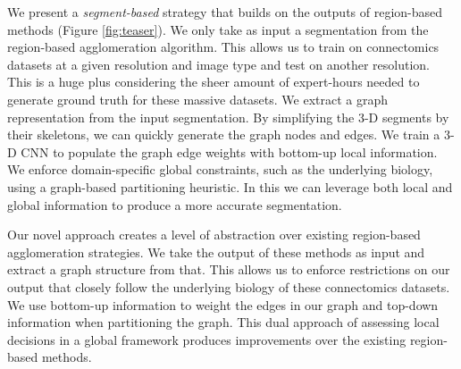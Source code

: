 We present a \textit{segment-based} strategy that builds on the outputs of region-based methods (Figure \ref{fig:teaser}).
We only take as input a segmentation from the region-based agglomeration algorithm. 
This allows us to train on connectomics datasets at a given resolution and image type and test on another resolution.
This is a huge plus considering the sheer amount of expert-hours needed to generate ground truth for these massive datasets.
We extract a graph representation from the input segmentation.
By simplifying the 3-D segments by their skeletons, we can quickly generate the graph nodes and edges. 
We train a 3-D CNN to populate the graph edge weights with bottom-up local information. 
We enforce domain-specific global constraints, such as the underlying biology, using a graph-based partitioning heuristic.
In this we can leverage both local and global information to produce a more accurate segmentation.

Our novel approach creates a level of abstraction over existing region-based agglomeration strategies. 
We take the output of these methods as input and extract a graph structure from that.
This allows us to enforce restrictions on our output that closely follow the underlying biology of these connectomics datasets. 
We use bottom-up information to weight the edges in our graph and top-down information when partitioning the graph. 
This dual approach of assessing local decisions in a global framework produces improvements over the existing region-based methods. 
